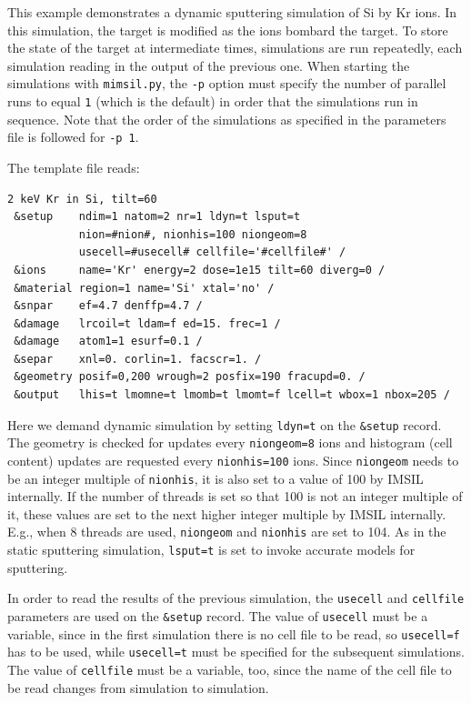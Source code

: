 This example demonstrates a dynamic sputtering simulation of Si by Kr ions. In
this simulation, the target is modified as the ions bombard the target. To store
the state of the target at intermediate times, simulations are run repeatedly,
each simulation reading in the output of the previous one. When starting the
simulations with \texttt{mimsil.py}, the \texttt{-p} option must specify the
number of parallel runs to equal \texttt{1} (which is the default) in
order that the simulations run in sequence. Note that the order of the
simulations as specified in the parameters file is followed for \texttt{-p 1}.

The template file reads:

\begin{verbatim}
2 keV Kr in Si, tilt=60
 &setup    ndim=1 natom=2 nr=1 ldyn=t lsput=t 
           nion=#nion#, nionhis=100 niongeom=8  
           usecell=#usecell# cellfile='#cellfile#' /
 &ions     name='Kr' energy=2 dose=1e15 tilt=60 diverg=0 /
 &material region=1 name='Si' xtal='no' /
 &snpar    ef=4.7 denffp=4.7 /
 &damage   lrcoil=t ldam=f ed=15. frec=1 /
 &damage   atom1=1 esurf=0.1 /
 &separ    xnl=0. corlin=1. facscr=1. /
 &geometry posif=0,200 wrough=2 posfix=190 fracupd=0. /
 &output   lhis=t lmomne=t lmomb=t lmomt=f lcell=t wbox=1 nbox=205 /
\end{verbatim}

Here we demand dynamic simulation by setting \texttt{ldyn=t} on the
\texttt{\&setup} record. 
The geometry is checked for updates every \texttt{niongeom=8} ions and
histogram (cell content) updates are requested every \texttt{nionhis=100} ions.
Since \texttt{niongeom} needs to be an integer multiple of 
\texttt{nionhis}, it is also set to a value of 100 by IMSIL internally.
If the number of threads is set so that 100 is not an integer multiple of it,
these values are set to the next higher integer multiple  by IMSIL internally.
E.g., when 8 threads are used, \texttt{niongeom} and \texttt{nionhis} are set
to 104.  
As in the static sputtering simulation, \texttt{lsput=t} is set to invoke
accurate models for sputtering.

In order to read the results of the previous simulation, the \texttt{usecell}
and \texttt{cellfile} parameters are used on the \texttt{\&setup} record. The
value of \texttt{usecell} must be a variable, since in the first simulation
there is no cell file to be read, so \texttt{usecell=f} has to be used, while
\texttt{usecell=t} must be specified for the subsequent simulations. The value
of \texttt{cellfile} must be a variable, too, since the name of the cell file to
be read changes from simulation to simulation.


